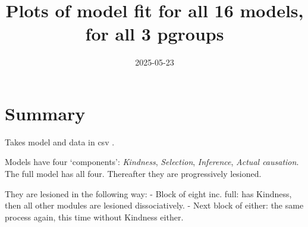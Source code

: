 \documentclass[
]{article}
\title{Plots of model fit for all 16 models, for all 3 pgroups}
\author{}
\date{\vspace{-2.5em}2025-05-23}
\begin{document}
\maketitle

\section{Summary}\label{summary}

Takes model and data in csv .

Models have four `components': \emph{Kindness}, \emph{Selection},
\emph{Inference}, \emph{Actual causation}. The full model has all four.
Thereafter they are progressively lesioned.

They are lesioned in the following way: - Block of eight inc. full: has
Kindness, then all other modules are lesioned dissociatively. - Next
block of either: the same process again, this time without Kindness
either.
\end{document}
